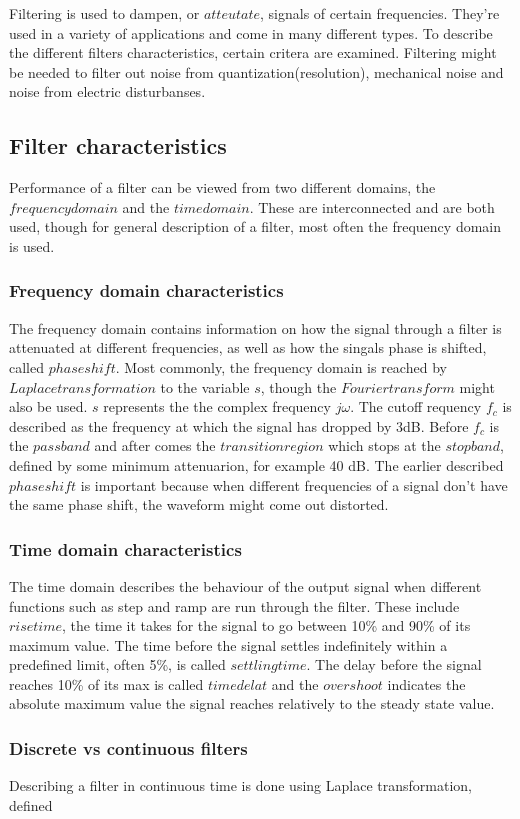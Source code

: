  Filtering is used to dampen, or $atteutate$, signals of certain frequencies.
They're used in a variety of applications and come in many different types. To
describe the different filters characteristics, certain critera are examined.
Filtering might be needed to filter out noise from quantization(resolution),
mechanical noise and noise from electric disturbanses.
\subsection*{Filter characteristics}
Performance of a filter can be viewed from two different domains, the $frequency
domain$ and the $time domain$. These are interconnected and are both used,
though for general description of a filter, most often the frequency domain is
used.
\subsubsection*{Frequency domain characteristics}
The frequency domain contains information on how the signal through a filter is
attenuated at different frequencies, as well as how the singals phase is
shifted, called $phase shift$. Most commonly, the frequency domain is reached by
$Laplace transformation$ to the variable $s$, though the $Fourier transform$
might also be used. $s$ represents the the complex frequency $j\omega$. The
cutoff requency $f_c$ is described as the frequency at which the signal has
dropped by 3dB. Before $f_c$ is the $passband$ and after comes the $transition
region$ which stops at the $stop band$, defined by some minimum attenuarion, for
example 40 dB. The earlier described $phase shift$ is important because when
different frequencies of a signal don't have the same phase shift, the waveform
might come out distorted.
\subsubsection*{Time domain characteristics}
The time domain describes the behaviour of the output signal when different
functions such as step and ramp are run through the filter. These include $rise
time$, the time it takes for the signal to go between 10\% and 90\% of its
maximum value. The time before the signal settles indefinitely within a
predefined limit, often 5\%, is called $settling time$. The delay before the
signal reaches 10\% of its max is called $time delat$ and the $overshoot$
indicates the absolute maximum value the signal reaches relatively to the steady
state value.
\subsubsection*{Discrete vs continuous filters}
Describing a filter in continuous time is done using Laplace transformation,
defined 
